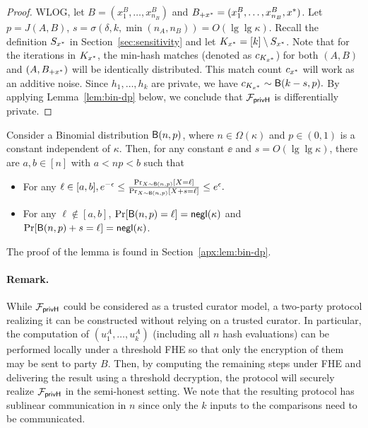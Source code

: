 \begin{proof}
WLOG, let $B = (x_1^B, \ldots, x_{n_B}^B)$ and $B_{+x^*} = (x_1^B, \ldots,
x_{n_B}^B, {x^*})$.  Let $p = J(A, B)$, $s = \sigma(\delta, k, \min(n_A,
n_B)) = O(\lg\lg \kappa)$.  Recall the definition $S_{x^*}$ in Section~\ref{sec:sensitivity} and let
$K_{x^*} = [k] \setminus S_{x^*}$.  Note that for the iterations in $K_{x^*}$,
the min-hash matches (denoted as $c_{K_{x^*}}$) for both $(A, B)$ and $(A, B_{+x^*})$ will be
identically distributed.
This match count $c_{x^*}$ will
work as an additive noise. Since $h_1, \ldots, h_k$ are private, we have
$c_{K_{x^*}} \sim \mathsf{B}(k-s, p).$ By applying Lemma~\ref{lem:bin-dp} below, we
conclude that ${\mathcal{F}_\mathsf{privH}}$ is differentially private. \qedhere
\end{proof}

\begin{lemma}
\label{lem:bin-dp}
Consider a Binomial distribution $\mathsf{B}(n,p)$, where $n \in \Omega(\kappa)$
and $p \in (0,1)$ is a constant independent of $\kappa$. Then, for any
constant $\ee$ and $s = O(\lg\lg \kappa)$, 
there are $a, b \in [n]$ with $a < np < b$ such that
\begin{itemize}
    \item For any $\ell \in [a,b], e^{-\epsilon} \le \frac{\Pr_{X\sim \mathsf{B}(n,p)}[X
    = \ell]}{\Pr_{X\sim \mathsf{B}(n,p)}[X+s = \ell]} \le e^{\epsilon}.$ 

    \item For any $\ell \not \in [a,b]$, $\Pr[\mathsf{B}(n,p) = \ell] =
    \mathsf{negl}(\kappa)$ and $\Pr[\mathsf{B}(n,p)+s = \ell] = \mathsf{negl}(\kappa)$.
\end{itemize}
\end{lemma}
%
The proof of the lemma is found in Section~\ref{apx:lem:bin-dp}.


\paragraph{Remark.} While ${\mathcal{F}_\mathsf{privH}}$ could be considered as a trusted curator
model, a two-party protocol realizing it can be constructed without
relying on a trusted curator. In particular, the computation of $(u^A_1,
\ldots, u^A_k)$ (including all $n$ hash evaluations) can be performed
locally under a threshold FHE so that only the encryption of them may
be sent to party $B$. Then, by computing the remaining steps under FHE
and delivering the result using a threshold decryption, the protocol
will securely realize ${\mathcal{F}_\mathsf{privH}}$ in the semi-honest setting. We note that the
resulting protocol has sublinear communication in $n$ since only the $k$
inputs to the comparisons need to be communicated.



